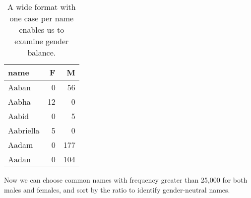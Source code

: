 \documentclass[]{tufte-handout}
\newenvironment{Shaded}{}{}
\newcommand{\KeywordTok}[1]{\textcolor[rgb]{0.00,0.44,0.13}{\textbf{{#1}}}}
\newcommand{\DataTypeTok}[1]{\textcolor[rgb]{0.56,0.13,0.00}{{#1}}}
\newcommand{\DecValTok}[1]{\textcolor[rgb]{0.25,0.63,0.44}{{#1}}}
\newcommand{\StringTok}[1]{\textcolor[rgb]{0.25,0.44,0.63}{{#1}}}
\newcommand{\NormalTok}[1]{{#1}}
\theoremstyle{definition}
\theoremstyle{definition}
\theoremstyle{definition}
\theoremstyle{remark}
\begin{document}
\begin{Shaded}
\end{Shaded}

\begin{table}

\caption{\label{tab:unnamed-chunk-7}A wide format with one case per name enables us to examine gender balance.}
\centering
\begin{tabular}[t]{l|r|r}
\hline
name & F & M\\
\hline
Aaban & 0 & 56\\
\hline
Aabha & 12 & 0\\
\hline
Aabid & 0 & 5\\
\hline
Aabriella & 5 & 0\\
\hline
Aadam & 0 & 177\\
\hline
Aadan & 0 & 104\\
\hline
\end{tabular}
\end{table}

Now we can choose common names with frequency greater than 25,000 for
both males and females, and sort by the ratio to identify gender-neutral
names.

\begin{Shaded}
\end{Shaded}
\end{document}
